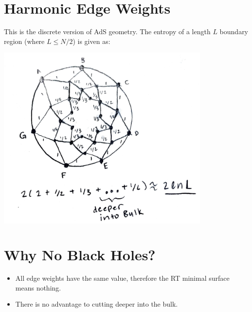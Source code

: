 \documentclass[12pt]{article}
\begin{document}
\section*{Harmonic Edge Weights}
This is the discrete version of AdS geometry. The entropy of a length \( L \) boundary region (where \( L \leq N/2 \)) is given as:

\begin{center}
    \includegraphics[width=0.8\textwidth]{harmonic.pdf}
\end{center}

\section*{Why No Black Holes?}
\begin{itemize}
    \item All edge weights have the same value, therefore the RT minimal surface means nothing.
    \item There is no advantage to cutting deeper into the bulk.
\end{itemize}
\end{document}
